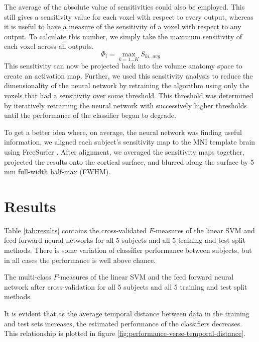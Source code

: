 \documentclass[preprint,authoryear,12pt]{elsarticle}
\begin{document}
The average of the absolute value of sensitivities could also be employed.
This still gives a sensitivity value for each voxel with respect to every output, whereas it is useful to have a measure of the sensitivity of a voxel with respect to any output.
To calculate this number, we simply take the maximum sensitivity of each voxel across all outputs.
\begin{equation}
\Phi_{i} = \max_{k=1 \dots K}{S_{ki,~avg}}
\end{equation}
This sensitivity can now be projected back into the volume anatomy space to create an activation map.
Further, we used this sensitivity analysis to reduce the dimensionality of the neural network by retraining the algorithm using only the voxels that had a sensitivity over some threshold.
This threshold was determined by iteratively retraining the neural network with successively higher thresholds until the performance of the classifier began to degrade.

To get a better idea where, on average, the neural network was finding useful information, we aligned each subject's sensitivity map to the MNI template brain using FreeSurfer \citep{FreeSurfer}.
After alignment, we averaged the sensitivity maps together, projected the results onto the cortical surface, and blurred along the surface by 5 mm full-width half-max (FWHM).

\section{Results}
Table \ref{tab:results} contains the cross-validated $F$-measures of the linear SVM and feed forward neural networks for all 5 subjects and all 5 training and test split methods.
There is some variation of classifier performance between subjects, but in all cases the performance is well above chance. 

\begin{table}
\centering

\caption{The multi-class $F$-measures of the linear SVM and the feed forward neural network after cross-validation for all 5 subjects and all 5 training and test split methods. }
\label{tab:results}
\end{table}

It is evident that as the average temporal distance between data in the training and test sets increases, the estimated performance of the classifiers decreases.
This relationship is plotted in figure \ref{fig:performance-verse-temporal-distance}.
\end{document}
